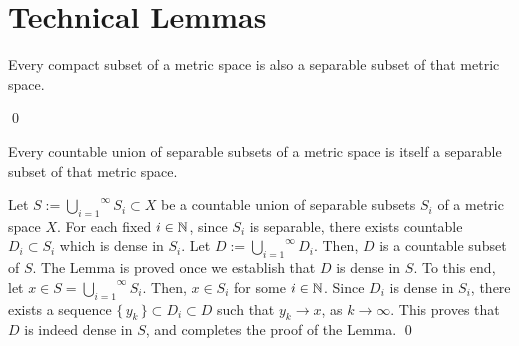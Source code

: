 

\section{Technical Lemmas}
\setcounter{theorem}{0}
\setcounter{equation}{0}

\renewcommand{\theenumi}{\roman{enumi}}
\renewcommand{\labelenumi}{\textnormal{(\theenumi)}$\;\;$}

\begin{lemma}
\mbox{}
\vskip 0.0cm
\noindent
Every compact subset of a metric space is also a separable subset of that metric space.
\end{lemma}
\proof

\qed

\vskip 0.5cm
\begin{lemma}
\mbox{}
\vskip 0.0cm
\noindent
Every countable union of separable subsets of a metric space is itself a separable subset of that metric space.
\end{lemma}
\proof
Let $S := \overset{\infty}{\underset{i=1}{\bigcup}}S_{i} \subset X$ be a countable union
of separable subsets $S_{i}$ of a metric space $X$.
For each fixed $i \in \mathbb{N}$,
since $S_{i}$ is separable, there exists countable $D_{i} \subset S_{i}$ which is dense in $S_{i}$.
Let $D := \overset{\infty}{\underset{i=1}{\bigcup}}D_{i}$.
Then, $D$ is a countable subset of $S$.
The Lemma is proved once we establish that $D$ is dense in $S$.
To this end, let $x \in S = \overset{\infty}{\underset{i=1}{\bigcup}}S_{i}$.
Then, $x \in S_{i}$ for some $i \in \mathbb{N}$.
Since $D_{i}$ is dense in $S_{i}$, there exists a sequence
$\{\,y_{k}\,\} \subset D_{i} \subset D$ such that $y_{k} \longrightarrow x$, as $k \longrightarrow \infty$.
This proves that $D$ is indeed dense in $S$, and completes the proof of the Lemma.
\qed

